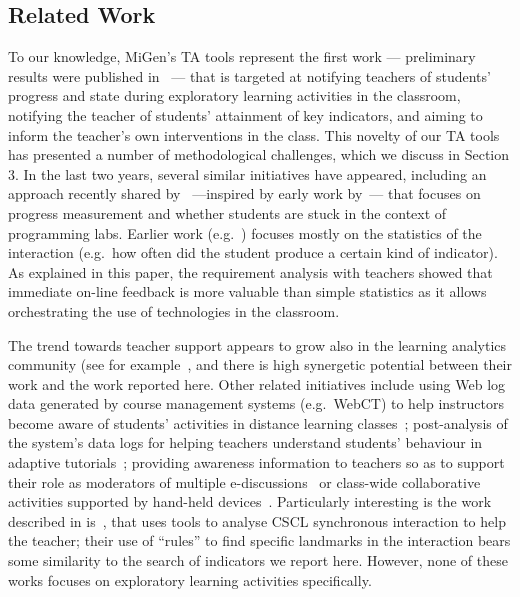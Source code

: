 \subsection{Related Work}
\label{sec:related}

To our knowledge, MiGen's TA tools represent the first work ---
preliminary results were published in~\cite{TA-ECTEL} --- that is
targeted at notifying teachers of students’ progress and state during
exploratory learning activities in the classroom, notifying the
teacher of students’ attainment of key indicators, and aiming to
inform the teacher’s own interventions in the class. This novelty of
our TA tools has presented a number of methodological challenges,
which we discuss in Section 3. In the last two years, several similar
initiatives have appeared, including an approach
recently shared by~\cite{Gutierrez12} ---inspired by early work
by~\cite{Yardi08}--- that focuses on progress measurement and
whether students are stuck in the context of programming labs.
Earlier work (e.g.~\cite{Gueraud09}) focuses mostly on the statistics
 of the interaction (e.g.~how often did the student produce a certain
 kind of indicator). As explained in this paper, the requirement
 analysis with teachers showed that immediate on-line feedback
 is more valuable than simple statistics as it allows orchestrating
 the use of technologies in the classroom.

The trend towards teacher support appears to grow
also in the learning analytics community
(see for example~\cite{Crespo12,Zaldivar12,Pardo12}, and there is high
synergetic potential between their work and the work reported here.
Other related initiatives include 
using Web log data generated by course management systems
(e.g.~WebCT) to help instructors become aware of students’
activities in distance learning classes~\cite{Mazza07}; post-analysis of
the system's data logs for helping teachers understand students'
behaviour in adaptive tutorials~\cite{BenAnim08}; 
 providing
awareness information to teachers so as to support their role as 
moderators of multiple e-discussions~\cite{Wichmann09} or class-wide
collaborative activities supported by hand-held devices~\cite{CortezNussbaum2009}. 
%
Particularly interesting is the work described in 
is~\cite{Avouris08}, that uses tools to analyse CSCL 
synchronous interaction to help the teacher; their use of ``rules'' to
find specific landmarks in the interaction bears some
similarity to the search of indicators we report here. 
%
However, none of these works
focuses on exploratory learning activities specifically. 

